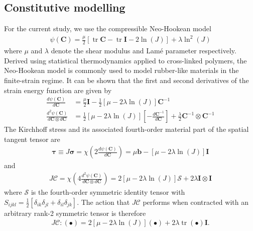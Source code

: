 \documentclass[AMA,STIX1COL]{WileyNJD-v2}
\DeclareMathOperator{\trace}{tr}
\begin{document}
\subsection{Constitutive modelling
\label{sec: Constitutive modelling}
}

For the current study, we use the compressible Neo-Hookean model
\begin{gather}
\psi \left( \mathbf{C} \right)
  = \frac{\mu}{2} \left[ \trace{\mathbf{C}} - \trace{\mathbf{I}} - 2 \ln\left( J \right) \right]
  + \lambda \ln^{2}\left( J \right)
\label{eq:neo_hookean_energy}
\end{gather}
where $\mu$ and $\lambda$ denote the shear modulus and Lam\'{e} parameter respectively.
Derived using statistical thermodynamics applied to cross-linked polymers, the Neo-Hookean model \cite{Treloar1975a,Treloar1976a} is commonly used to model rubber-like materials in the finite-strain regime.
It can be shown that the first and second derivatives of the strain energy function are given by
\begin{align}
\frac{d \psi \left( \mathbf{C} \right)}{d \mathbf{C}}
  &= \frac{\mu}{2} \mathbf{I} - \frac{1}{2} \left[ \mu - 2\lambda\ln\left( J \right) \right] \mathbf{C}^{-1} \\
\frac{d^{2} \psi \left( \mathbf{C} \right)}{d \mathbf{C} \otimes d \mathbf{C}}
  &= \frac{1}{2}\left[ \mu - 2\lambda\ln\left( J \right) \right] \left[ - \frac{d \mathbf{C}^{-1}}{d \mathbf{C}} \right]
  + \frac{\lambda}{2} \mathbf{C}^{-1} \otimes \mathbf{C}^{-1}
\end{align}
The Kirchhoff stress and its associated fourth-order material part of the spatial tangent tensor are
\begin{gather}
\boldsymbol{\tau}
  \equiv J \boldsymbol{\sigma}
  = \chi\left( 2 \frac{d \psi \left( \mathbf{C} \right)}{d \mathbf{C}} \right)
  = \mu \mathbf{b} - \left[ \mu - 2\lambda\ln\left( J \right) \right] \mathbf{I}
\end{gather}
and
\begin{gather}
J \boldsymbol{\mathcal{C}}
  = \chi\left( 4 \frac{d^{2} \psi \left( \mathbf{C} \right)}{d \mathbf{C} \otimes d \mathbf{C}} \right)
  = 2 \left[ \mu - 2\lambda\ln\left( J \right) \right] \boldsymbol{\mathcal{S}}
  + 2 \lambda \mathbf{I} \otimes \mathbf{I}
\end{gather}
where $\boldsymbol{\mathcal{S}}$ is the fourth-order symmetric identity tensor
with $S_{ijkl}=\frac{1}{2}\left[\delta_{ik}\delta_{jl}+\delta_{il}\delta_{jk}\right]$.
The action that $J \boldsymbol{\mathcal{C}}$ performs when contracted with an arbitrary rank-2 symmetric tensor is therefore
\begin{gather}
J \boldsymbol{\mathcal{C}} : \left( \bullet \right)
  = 2 \left[ \mu - 2\lambda\ln\left( J \right) \right] \left( \bullet \right)
  + 2 \lambda \trace\left( \bullet \right) \mathbf{I}.
\label{eq:simplified_action}
\end{gather}
\end{document}
